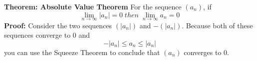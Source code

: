 \nopagenumbers
{\bf Theorem: Absolute Value Theorem}
\vskip 6pt
For the sequence $(a_n)$, if $$\lim_{n\to\infty}|a_n|=0 \; then \;\lim_{n\to\infty}a_n=0$$
\vskip 10pt
{\bf Proof:}
\vskip 6pt
Consider the two sequences $(|a_n|)$ and $-(|a_n|)$. Because both of these sequences converge to $0$ and $$-|a_n| \leq a_n \leq |a_n|$$ you can use the Squeeze Theorem to conclude that $(a_n)$ converges to $0$.

\vfill\eject

